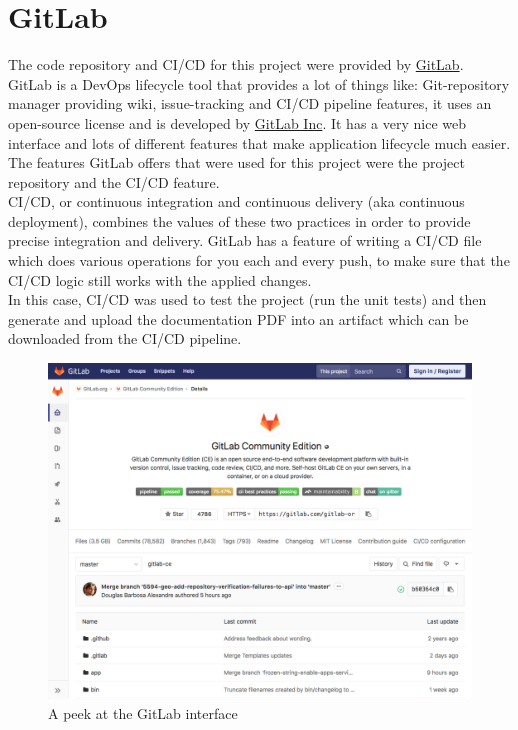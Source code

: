 \section{GitLab}
\label{sec:GitLab}
The code repository and CI/CD for this project were provided by \href{https://gitlab.com/}{GitLab}.\\
GitLab is a DevOps lifecycle tool that provides a lot of things like: Git-repository manager providing wiki, issue-tracking and CI/CD pipeline features, it uses an open-source license and is developed by \href{https://about.gitlab.com/company/}{GitLab Inc}.
It has a very nice web interface and lots of different features that make application lifecycle much easier. The features GitLab offers that were used for this project were the project repository and the CI/CD feature.\\
\newline
CI/CD, or continuous integration and continuous delivery (aka continuous deployment), combines the values of these two practices in order to provide precise integration and delivery.
GitLab has a feature of writing a CI/CD file which does various operations for you each and every push, to make sure that the CI/CD logic still works with the applied changes.\\
In this case, CI/CD was used to test the project (run the unit tests) and then generate and upload the documentation PDF into an artifact which can be downloaded from the CI/CD pipeline.
\begin{figure}[H]
	\includegraphics[width=\linewidth]{./Images/Implementation/gitlab_view.png}
	\caption{A peek at the GitLab interface}
\end{figure}	
